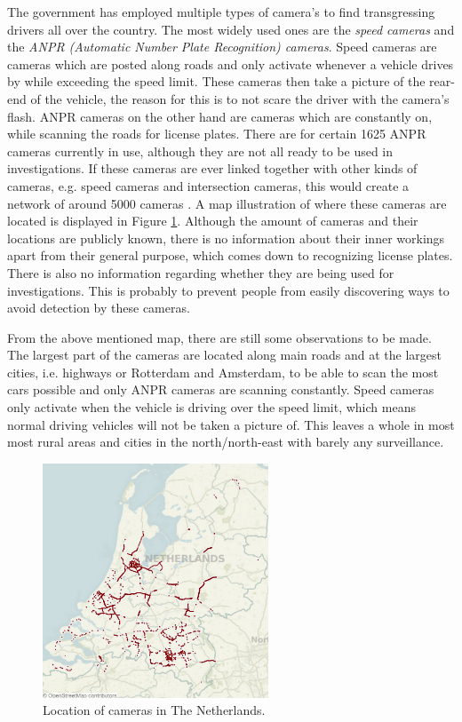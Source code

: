 The government has employed multiple types of camera's to find transgressing drivers all over the country. The most widely used ones are the \emph{speed cameras} and the \emph{ANPR (Automatic Number Plate Recognition) cameras}. Speed cameras are cameras which are posted along roads and only activate whenever a vehicle drives by while exceeding the speed limit. These cameras then take a picture of the rear-end of the vehicle, the reason for this is to not scare the driver with the camera's flash. ANPR cameras on the other hand are cameras which are constantly on, while scanning the roads for license plates.  There are for certain 1625 ANPR cameras \cite{anpr-cameras} currently in use, although they are not all ready to be used in investigations. If these cameras are ever linked together with other kinds of cameras, e.g. speed cameras and intersection cameras, this would create a network of around 5000 cameras \cite{speed-cameras}. A map illustration of where these cameras are located is displayed in Figure \ref{fig:cameras-netherlands}. Although the amount of cameras and their locations are publicly known, there is no information about their inner workings apart from their general purpose, which comes down to recognizing license plates. There is also no information regarding whether they are being used for investigations. This is probably to prevent people from easily discovering ways to avoid detection by these cameras.

From the above mentioned map, there are still some observations to be made. The largest part of the cameras are located along main roads and at the largest cities, i.e. highways or Rotterdam and Amsterdam, to be able to scan the most cars possible and only ANPR cameras are scanning constantly. Speed cameras only activate when the vehicle is driving over the speed limit, which means normal driving vehicles will not be taken a picture of. This leaves a whole in most most rural areas and cities in the north/north-east with barely any surveillance.

\begin{figure}[ht]
    \centering
    \includegraphics[width=0.6\textwidth]{plaatjes/anpr-cameras}
    \caption{Location of cameras in The Netherlands.}
    \label{fig:cameras-netherlands}
\end{figure}%


